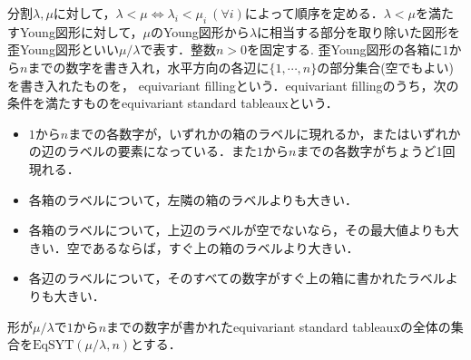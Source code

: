\begin{defin}
  分割$\lambda, \mu$に対して，$\lambda<\mu\Leftrightarrow \lambda_i<\mu_i\:(\forall i)$によって順序を定める．$\lambda<\mu$を満たすYoung図形に対して，$\mu$のYoung図形から$\lambda$に相当する部分を取り除いた図形を歪Young図形といい$\mu/\lambda$で表す．整数$n>0$を固定する. 歪Young図形の各箱に$1$から$n$までの数字を書き入れ，水平方向の各辺に$\{1,\cdots,n\}$の部分集合(空でもよい)を書き入れたものを， equivariant fillingという．equivariant fillingのうち，次の条件を満たすものをequivariant standard tableauxという．
  \begin{itemize}
    \item $1$から$n$までの各数字が，いずれかの箱のラベルに現れるか，またはいずれかの辺のラベルの要素になっている．また$1$から$n$までの各数字がちょうど1回現れる．
    \item 各箱のラベルについて，左隣の箱のラベルよりも大きい．
    \item 各箱のラベルについて，上辺のラベルが空でないなら，その最大値よりも大きい．空であるならば，すぐ上の箱のラベルより大きい．
    \item 各辺のラベルについて，そのすべての数字がすぐ上の箱に書かれたラベルよりも大きい．
  \end{itemize}
  形が$\mu/\lambda$で$1$から$n$までの数字が書かれたequivariant standard tableauxの全体の集合を$\text{EqSYT}(\mu/\lambda, n)$とする．
\end{defin}


